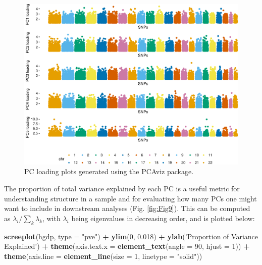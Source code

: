 \documentclass{svmult}       %
\newenvironment{Shaded}{\begin{snugshade}}{\end{snugshade}}
\newcommand{\KeywordTok}[1]{\textcolor[rgb]{0.13,0.29,0.53}{\textbf{#1}}}
\newcommand{\DataTypeTok}[1]{\textcolor[rgb]{0.13,0.29,0.53}{#1}}
\newcommand{\DecValTok}[1]{\textcolor[rgb]{0.00,0.00,0.81}{#1}}
\newcommand{\FloatTok}[1]{\textcolor[rgb]{0.00,0.00,0.81}{#1}}
\newcommand{\StringTok}[1]{\textcolor[rgb]{0.31,0.60,0.02}{#1}}
\newcommand{\OperatorTok}[1]{\textcolor[rgb]{0.81,0.36,0.00}{\textbf{#1}}}
\newcommand{\NormalTok}[1]{#1}
\begin{document}
\begin{figure}
\includegraphics[width=1\linewidth]{Figures/Figure8}
\caption{\label{fig:Fig8}
    PC loading plots generated using the PCAviz package.}
\end{figure}

The proportion of total variance explained by each PC is a useful metric
for understanding structure in a sample and for evaluating how many PCs
one might want to include in downstream analyses (Fig. \ref{fig:Fig9}). This can be computed
as \(\lambda_i / \sum_{k} \lambda_k\), with \(\lambda_i\) being
eigenvalues in decreasing order, and is plotted below:

\begin{Shaded}
\begin{Highlighting}[]
\KeywordTok{screeplot}\NormalTok{(hgdp, }\DataTypeTok{type =} \StringTok{"pve"}\NormalTok{) }\OperatorTok{+}\StringTok{ }
\StringTok{  }\KeywordTok{ylim}\NormalTok{(}\DecValTok{0}\NormalTok{, }\FloatTok{0.018}\NormalTok{) }\OperatorTok{+}
\StringTok{  }\KeywordTok{ylab}\NormalTok{(}\StringTok{'Proportion of Variance Explained'}\NormalTok{) }\OperatorTok{+}
\StringTok{  }\KeywordTok{theme}\NormalTok{(}\DataTypeTok{axis.text.x =} \KeywordTok{element_text}\NormalTok{(}\DataTypeTok{angle =} \DecValTok{90}\NormalTok{, }\DataTypeTok{hjust =} \DecValTok{1}\NormalTok{)) }\OperatorTok{+}
\StringTok{  }\KeywordTok{theme}\NormalTok{(}\DataTypeTok{axis.line =} \KeywordTok{element_line}\NormalTok{(}\DataTypeTok{size =} \DecValTok{1}\NormalTok{, }\DataTypeTok{linetype =} \StringTok{"solid"}\NormalTok{))}
\end{Highlighting}
\end{Shaded}
\end{document}
